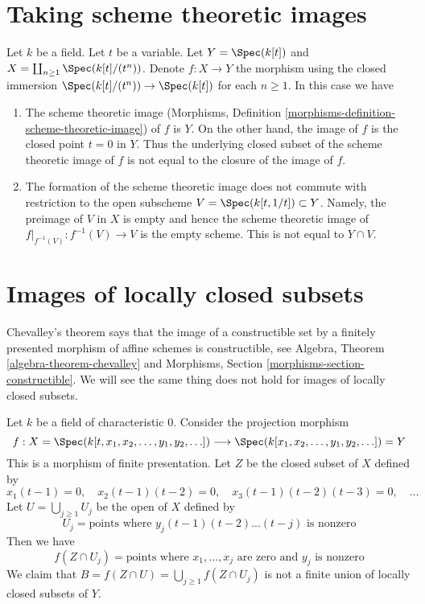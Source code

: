 \section{Taking scheme theoretic images}
\label{section-scheme-theoretic-image}

\noindent
Let $k$ be a field. Let $t$ be a variable. Let $Y = \Spec(k[t])$
and $X = \coprod_{n \geq 1} \Spec(k[t]/(t^n))$. Denote
$f : X \to Y$ the morphism
using the closed immersion $\Spec(k[t]/(t^n)) \to \Spec(k[t])$
for each $n \geq 1$. In this case we have
\begin{enumerate}
\item The scheme theoretic image
(Morphisms, Definition \ref{morphisms-definition-scheme-theoretic-image})
of $f$ is $Y$. On the other hand, the image of $f$ is the closed
point $t = 0$ in $Y$. Thus the underlying closed subset of the
scheme theoretic image of $f$
is not equal to the closure of the image of $f$.
\item The formation of the scheme theoretic image does not commute
with restriction to the open subscheme $V = \Spec(k[t, 1/t]) \subset Y$.
Namely, the preimage of $V$ in $X$ is empty and hence the scheme theoretic
image of $f|_{f^{-1}(V)} : f^{-1}(V) \to V$ is the empty scheme.
This is not equal to $Y \cap V$.
\end{enumerate}




\section{Images of locally closed subsets}
\label{section-non-chevalley}

\noindent
Chevalley's theorem says that the image of a constructible set
by a finitely presented morphism of affine schemes is constructible, see
Algebra, Theorem \ref{algebra-theorem-chevalley} and
Morphisms, Section \ref{morphisms-section-constructible}.
We will see the same thing does not hold
for images of locally closed subsets.

\medskip\noindent
Let $k$ be a field of characteristic $0$. Consider the projection morphism
$$
f :
X = \Spec(k[t, x_1, x_2, \ldots, y_1, y_2, \ldots])
\longrightarrow
\Spec(k[x_1, x_2, \ldots, y_1, y_2, \ldots]) = Y
$$
This is a morphism of finite presentation.
Let $Z$ be the closed subset of $X$ defined by
$$
x_1(t - 1) = 0,\quad
x_2(t - 1)(t - 2) = 0,\quad
x_3(t - 1)(t - 2)(t - 3) = 0,\quad \ldots
$$
Let $U = \bigcup_{j \geq 1} U_j$ be the open of $X$ defined by
$$
U_j = \text{points where }y_j(t - 1)(t - 2) ... (t - j)\text{ is nonzero}
$$
Then we have
$$
f(Z \cap U_j) =
\text{points where }x_1, \ldots, x_j\text{ are zero and }y_j\text{ is nonzero}
$$
We claim that $B = f(Z \cap U) = \bigcup_{j \geq 1} f(Z \cap U_j)$ is
not a finite union of locally closed subsets of $Y$.


